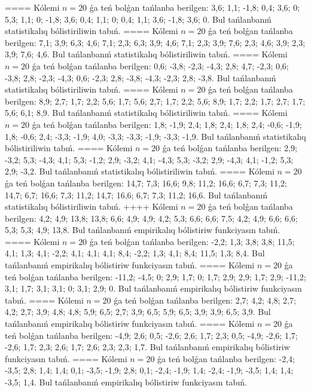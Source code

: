 ====
Kólemi \(n = 20\) ǵa teń bolǵan tańlanba berilgen: 3,6; 1,1; -1,8; 0,4; 3,6; 0; 5,3; 1,1; 0; -1,8; 3,6; 0,4; 1,1; 0; 0,4; 1,1; 3,6; -1,8; 3,6; 0. Bul tańlanbanıń statistikalıq bólistiriliwin tabıń.
====
Kólemi \(n = 20\) ǵa teń bolǵan tańlanba berilgen: 7,1; 3,9; 6,3; 4,6; 7,1; 2,3; 6,3; 3,9; 4,6; 7,1; 2,3; 3,9; 7,6; 2,3; 4,6; 3,9; 2,3; 3,9; 7,6; 4,6. Bul tańlanbanıń statistikalıq bólistiriliwin tabıń.
====
Kólemi \(n = 20\) ǵa teń bolǵan tańlanba berilgen: 0,6; -3,8; -2,3; -4,3; 2,8; 4,7; -2,3; 0,6; -3,8; 2,8; -2,3; -4,3; 0,6; -2,3; 2,8; -3,8; -4,3; -2,3; 2,8; -3,8. Bul tańlanbanıń statistikalıq bólistiriliwin tabıń.
====
Kólemi \(n = 20\) ǵa teń bolǵan tańlanba berilgen: 8,9; 2,7; 1,7; 2,2; 5,6; 1,7; 5,6; 2,7; 1,7; 2,2; 5,6; 8,9; 1,7; 2,2; 1,7; 2,7; 1,7; 5,6; 6,1; 8,9. Bul tańlanbanıń statistikalıq bólistiriliwin tabıń.
====
Kólemi \(n = 20\) ǵa teń bolǵan tańlanba berilgen: 1,8; -1,9; 2,4; 1,8; 2,4; 1,8; 2,4; -0,6; -1,9; 1,8; -0,6; 2,4; -3,3; -1,9; 4,0; -3,3; -3,3; -1,9; -3,3; -1,9. Bul tańlanbanıń statistikalıq bólistiriliwin tabıń.
====
Kólemi \(n = 20\) ǵa teń bolǵan tańlanba berilgen: 2,9; -3,2; 5,3; -4,3; 4,1; 5,3; -1,2; 2,9; -3,2; 4,1; -4,3; 5,3; -3,2; 2,9; -4,3; 4,1; -1,2; 5,3; 2,9; -3,2. Bul tańlanbanıń statistikalıq bólistiriliwin tabıń.
====
Kólemi \(n = 20\) ǵa teń bolǵan tańlanba berilgen: 14,7; 7,3; 16,6; 9,8; 11,2; 16,6; 6,7; 7,3; 11,2; 14,7; 6,7; 16,6; 7,3; 11,2; 14,7; 16,6; 6,7; 7,3; 11,2; 16,6. Bul tańlanbanıń statistikalıq bólistiriliwin tabıń.
++++
Kólemi \(n = 20\) ǵa teń bolǵan tańlanba berilgen: 4,2; 4,9; 13,8; 13,8; 6,6; 4,9; 4,9; 4,2; 5,3; 6,6; 6,6; 7,5; 4,2; 4,9; 6,6; 6,6; 5,3; 5,3; 4,9; 13,8. Bul tańlanbanıń empirikalıq bólistiriw funkciyasın tabıń.
====
Kólemi \(n = 20\) ǵa teń bolǵan tańlanba berilgen: -2,2; 1,3; 3,8; 3,8; 11,5; 4,1; 1,3; 4,1; -2,2; 4,1; 4,1; 4,1; 8,4; -2,2; 1,3; 4,1; 8,4; 11,5; 1,3; 8,4. Bul tańlanbanıń empirikalıq bólistiriw funkciyasın tabıń.
====
Kólemi \(n = 20\) ǵa teń bolǵan tańlanba berilgen: -11,2; -4,5; 0; 2,9; 1,7; 0; 1,7; 2,9; 2,9; 1,7; 2,9; -11,2; 3,1; 1,7; 3,1; 3,1; 0; 3,1; 2,9; 0. Bul tańlanbanıń empirikalıq bólistiriw funkciyasın tabıń.
====
Kólemi \(n = 20\) ǵa teń bolǵan tańlanba berilgen: 2,7; 4,2; 4,8; 2,7; 4,2; 2,7; 3,9; 4,8; 4,8; 5,9; 6,5; 2,7; 3,9; 6,5; 5,9; 6,5; 3,9; 3,9; 6,5; 3,9. Bul tańlanbanıń empirikalıq bólistiriw funkciyasın tabıń.
====
Kólemi \(n = 20\) ǵa teń bolǵan tańlanba berilgen: -4,9; 2,6; 0,5; -2,6; 2,6; 1,7; 2,3; 0,5; -4,9; -2,6; 1,7; -2,6; 1,7; 2,3; 2,6; 1,7; 2,6; 2,3; 2,3; 1,7. Bul tańlanbanıń empirikalıq bólistiriw funkciyasın tabıń.
====
Kólemi \(n = 20\) ǵa teń bolǵan tańlanba berilgen: -2,4; -3,5; 2,8; 1,4; 1,4; 0,1; -3,5; -1,9; 2,8; 0,1; -2,4; -1,9; 1,4; -2,4; -1,9; -3,5; 1,4; 1,4; -3,5; 1,4. Bul tańlanbanıń empirikalıq bólistiriw funkciyasın tabıń.
